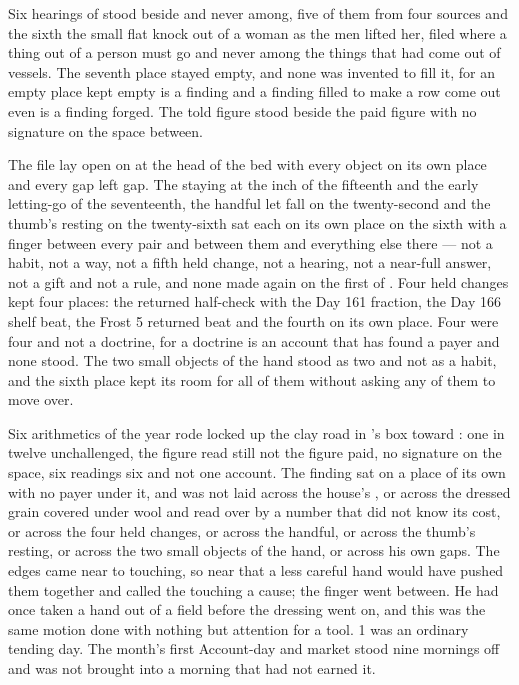 Six hearings of  stood beside and never among, five of them from four sources and the sixth the small flat knock out of a woman as the men lifted her, filed where a thing out of a person must go and never among the things that had come out of vessels. The seventh place stayed empty, and none was invented to fill it, for an empty place kept empty is a finding and a finding filled to make a row come out even is a finding forged. The told figure stood beside the paid figure with no signature on the space between.

The file lay open on  at the head of the bed with every object on its own place and every gap left gap. The staying at the inch of the fifteenth and the early letting-go of the seventeenth, the handful let fall on the twenty-second and the thumb's resting on the twenty-sixth sat each on its own place on the sixth with a finger between every pair and between them and everything else there --- not a habit, not a way, not a fifth held change, not a hearing, not a near-full answer, not a gift and not a rule, and none made again on the first of . Four held changes kept four places: the returned half-check with the Day 161 fraction, the Day 166 shelf beat, the Frost 5 returned beat and the fourth on its own place. Four were four and not a doctrine, for a doctrine is an account that has found a payer and none stood. The two small objects of the hand stood as two and not as a habit, and the sixth place kept its room for all of them without asking any of them to move over.

Six arithmetics of the year rode locked up the clay road in 's box toward : one in twelve unchallenged, the figure read still not the figure paid, no signature on the space, six readings six and not one account. The finding sat on a place of its own with no payer under it, and was not laid across the house's , or across the dressed grain covered under wool and read over by a number that did not know its cost, or across the four held changes, or across the handful, or across the thumb's resting, or across the two small objects of the hand, or across his own gaps. The edges came near to touching, so near that a less careful hand would have pushed them together and called the touching a cause; the finger went between. He had once taken a hand out of a field before the dressing went on, and this was the same motion done with nothing but attention for a tool.  1 was an ordinary tending day. The month's first Account-day and market stood nine mornings off and was not brought into a morning that had not earned it.

